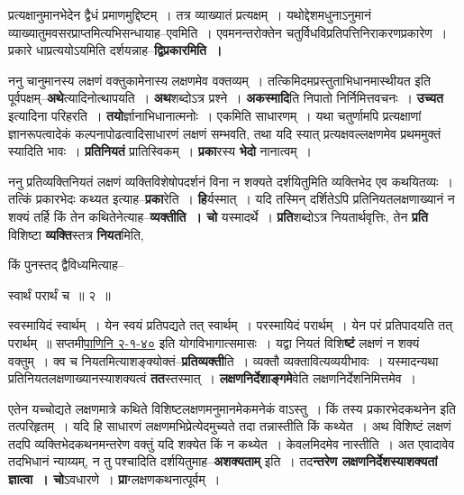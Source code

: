 \documentclass[article,12pt,a4paper]{memoir}
\begin{document}
	  \endgroup
	

	  \pstart प्रत्यक्षानुमानभेदेन द्वैधं प्रमाणमुद्दिष्टम् । तत्र व्याख्यातं प्रत्यक्षम् । यथोद्देशमधुनाऽनुमानं व्याख्यातुमवसरप्राप्तमित्यभिसन्धायाह--एवमिति । एवमनन्तरोक्तेन चतुर्विधविप्रतिपत्तिनिराकरणप्रकारेण । प्रकारे धाप्रत्ययोऽयमिति दर्शयन्नाह--\textbf{द्विप्रकारमिति ।}
	\pend
      

	  \pstart ननु चानुमानस्य लक्षणं वक्तुकामेनास्य लक्षणमेव वक्तव्यम् । तत्किमिदमप्रस्तुताभिधानमास्थीयत इति पूर्वपक्षम्--\textbf{अथे}त्यादिनोत्थापयति । \textbf{अथ}शब्दोऽत्र प्रश्ने । \textbf{अकस्मादि}ति निपातो निर्निमित्तवचनः । \textbf{उच्यत} इत्यादिना परिहरति । \textbf{तयो}र्ज्ञानाभिधानात्मनोः । एकमिति साधारणम् । यथा चतुर्णामपि प्रत्यक्षाणां ज्ञानरूपत्वादेकं कल्पनापोढत्वादिसाधारणं लक्षणं सम्भवति, तथा यदि स्यात् प्रत्यक्षवल्लक्षणमेव प्रथममुक्तं स्यादिति भावः । \textbf{प्रतिनियतं} प्रातिस्विकम् । \textbf{प्रका}रस्य \textbf{भेदो} नानात्वम् ।
	\pend
      

	  \pstart ननु प्रतिव्यक्तिनियतं लक्षणं व्यक्तिविशेषोपदर्शनं विना न शक्यते दर्शयितुमिति व्यक्तिभेद एव कथयितव्यः । तत्किं प्रकारभेदः कथ्यत इत्याह--\textbf{प्रका}रेति । \textbf{हि}र्यस्मात् । यदि तस्मिन् दर्शितेऽपि प्रतिनियतलक्षणाख्यानं न शक्यं तर्हि किं तेन कथितेनेत्याह--\textbf{व्यक्तीति । चो} यस्मादर्थे । \textbf{प्रति}शब्दोऽत्र नियतार्थवृत्तिः, तेन \textbf{प्रति} विशिष्टा \textbf{व्यक्ति}स्तत्र \textbf{नियत}मिति,  \leavevmode{} 
	  
	किं पुनस्तद् द्वैविध्यमित्याह--  
	  
	स्वार्थं परार्थं च ॥ २ ॥ 
	  
	स्वस्मायिदं स्वार्थम् । येन स्वयं प्रतिपद्यते तत् स्वार्थम् । परस्मायिदं परार्थम् । येन परं प्रतिपादयति तत् परार्थम् ॥ सप्तमी\href{http://sarit.indology.info/?cref=Pā.2.1.40}{पाणिनि २-१-४०} इति योगविभागात्समासः । यद्वा नियतं विशि\textbf{ष्टं} लक्षणं न शक्यं वक्तुम् । क्व च नियतमित्याशङ्क्योक्तं--\textbf{प्रतिव्यक्ती}ति । व्यक्तौ व्यक्तावित्यव्ययीभावः । यस्मादन्यथा प्रतिनियतलक्षणाख्यानस्याशक्यत्वं \textbf{तत}स्तस्मात् । \textbf{लक्षणनिर्देशाङ्गमे}वेति लक्षणनिर्देशनिमित्तमेव ।
	\pend
      

	  \pstart एतेन यच्चोद्यते लक्षणमात्रे कथिते विशिष्टलक्षणमनुमानमेकमनेकं वाऽस्तु । किं तस्य प्रकारभेदकथनेन इति तत्परिहृतम् । यदि हि साधारणं लक्षणमभिप्रेत्येदमुच्यते तदा तन्नास्तीति किं कथ्येत । अथ विशिष्टं लक्षणं तदपि व्यक्तिभेदकथनमन्तरेण वक्तुं यदि शक्येत किं न कथ्येत । केवलमिदमेव नास्तीति । अत एवादावेव तदभिधानं न्याय्यम्, न तु पश्चादिति दर्शयितुमाह--\textbf{अशक्यताम्} इति । तद\textbf{न्तरेण लक्षणनिर्देशस्याशक्यतां ज्ञात्वा । चो}ऽवधारणे । \textbf{प्रा}ग्लक्षणकथनात्पूर्वम् ।
	\pend
      
\end{document}
